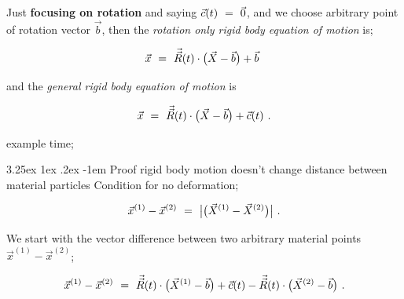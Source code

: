 \documentclass{article}
\makeatletter
\renewcommand\subparagraph{\@startsection{subparagraph}{6}{\parindent}%
  {3.25ex \@plus1ex \@minus .2ex}%
  {-1em}%
  {\normalfont\normalsize\bfseries}}
\makeatother
\begin{document}
Just \textbf{focusing on rotation} and saying \begin{math} \vec{c}(t) \hspace{0.125cm} = \hspace{0.125cm} \vec{0} \end{math}, and we choose arbitrary point of rotation vector \begin{math} \vec{b} \end{math}, then the \textit{rotation only rigid body equation of motion} is;

\begin{equation} \label{eb-eq-1-34}
\vec{x} \hspace{0.125cm} = \hspace{0.125cm} \vec{\vec{R}}(t) \cdot \big( \vec{X} - \vec{b} \big) + \vec{b}   \hspace{0.125cm} 
\end{equation}

and the \textit{general rigid body equation of motion} is 

\begin{equation} \label{eb-eq-1-35}
\vec{x} \hspace{0.125cm} = \hspace{0.125cm} \vec{\vec{R}}(t) \cdot \big( \vec{X} - \vec{b} \big) + \vec{c}(t)  \hspace{0.125cm} .
\end{equation}

example time;

\subparagraph{Proof rigid body motion doesn't change distance between material particles}
Condition for no deformation;

\begin{equation} \label{eb-eq-1-36}
\vec{x}^{(1)} - \vec{x}^{(2)} \hspace{0.125cm} = \hspace{0.125cm} \big| \big( \vec{X}^{(1)} - \vec{X}^{(2)} \big) \big| \hspace{0.125cm} .
\end{equation}

We start with the vector difference between two arbitrary material points \begin{math} \vec{x}^{(1)} - \vec{x}^{(2)} \end{math};

\begin{equation} \label{eb-eq-1-37}
\vec{x}^{(1)} - \vec{x}^{(2)} \hspace{0.125cm} = \hspace{0.125cm} \vec{\vec{R}}(t) \cdot \big( \vec{X}^{(1)} - \vec{b} \big) +  \vec{c}(t) - \vec{\vec{R}}(t) \cdot \big( \vec{X}^{(2)} - \vec{b} \big) \hspace{0.125cm} .
\end{equation}
\end{document}

